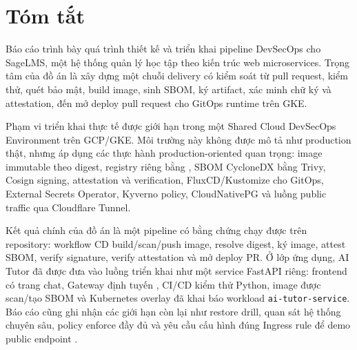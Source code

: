 \chapter*{Tóm tắt}

Báo cáo trình bày quá trình thiết kế và triển khai pipeline DevSecOps cho SageLMS, một hệ thống quản lý học tập theo kiến trúc web microservices. Trọng tâm của đồ án là xây dựng một chuỗi delivery có kiểm soát từ pull request, kiểm thử, quét bảo mật, build image, sinh SBOM, ký artifact, xác minh chữ ký và attestation, đến mở deploy pull request cho GitOps runtime trên GKE.

Phạm vi triển khai thực tế được giới hạn trong một Shared Cloud DevSecOps Environment trên GCP/GKE. Môi trường này không được mô tả như production thật, nhưng áp dụng các thực hành production-oriented quan trọng: image immutable theo digest, registry riêng bằng \Harbor{}, SBOM CycloneDX bằng Trivy, Cosign signing, attestation và verification, FluxCD/Kustomize cho GitOps, External Secrets Operator, Kyverno policy, CloudNativePG và luồng public traffic qua Cloudflare Tunnel.

Kết quả chính của đồ án là một pipeline có bằng chứng chạy được trên repository: workflow CD build/scan/push image, resolve digest, ký image, attest SBOM, verify signature, verify attestation và mở deploy PR. Ở lớp ứng dụng, AI Tutor đã được đưa vào luồng triển khai như một service FastAPI riêng: frontend có trang chat, Gateway định tuyến , CI/CD kiểm thử Python, image được scan/tạo SBOM và Kubernetes overlay đã khai báo workload \texttt{ai-tutor-service}. Báo cáo cũng ghi nhận các giới hạn còn lại như restore drill, quan sát hệ thống chuyên sâu, policy enforce đầy đủ và yêu cầu cấu hình đúng Ingress rule để demo public endpoint .
